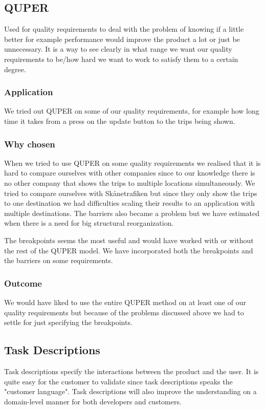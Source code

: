 \documentclass[a4paper]{article}
\begin{document}
		\subsection{QUPER}
		Used for quality requirements to deal with the problem of knowing if a little better for example performance would improve the product a lot or just be unnecessary. It is a way to see clearly in what range we want our quality requirements to be/how hard we want to work to satisfy them to a certain degree.
			\subsubsection{Application}
			We tried out QUPER on some of our quality requirements, for example how long time it takes from a press on the update button to the trips being shown.
			\subsubsection{Why chosen}
			When we tried to use QUPER on some quality requirements we realised that it is hard to compare ourselves with other companies since to our knowledge there is no other company that shows the trips to multiple locations simultaneously. We tried to compare ourselves with Skånetrafiken but since they only show the trips to one destination we had difficulties scaling their results to an application with multiple destinations. The barriers also became a problem but we have estimated when there is a need for big structural reorganization. 
			
			The breakpoints seems the most useful and would have worked with or without the rest of the QUPER model. We have incorporated both the breakpoints and the barriers on some requirements.

			\subsubsection{Outcome}
			We would have liked to use the entire QUPER method on at least one of our quality requirements but because of the problems discussed above we had to settle for just specifying the breakpoints.		
		
		
		\subsection{Task Descriptions}
			Task descriptions specify the interactions between the product and the user. It is quite easy for the customer to validate since task descriptions speaks the "customer language". Task descriptions will also improve the understanding on a domain-level manner for both developers and customers.
\end{document}
